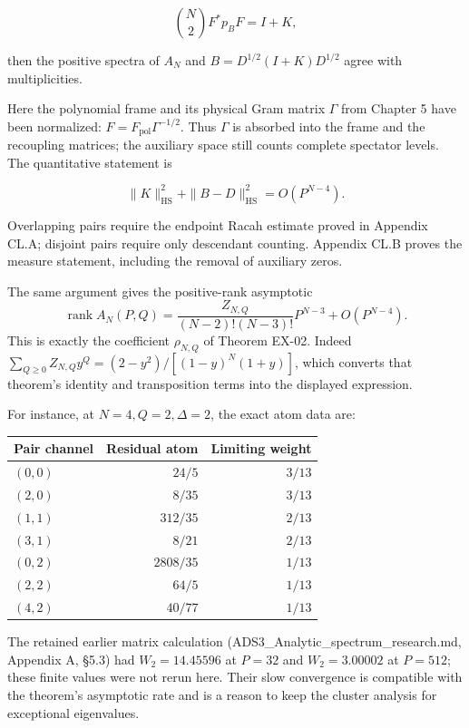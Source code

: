 \[
\binom N2 F^*p_BF=I+K,
\]

then the positive spectra of \(A_N\) and \(B=D^{1/2}(I+K)D^{1/2}\) agree with multiplicities.

Here the polynomial frame and its physical Gram matrix \(\Gamma\) from Chapter 5 have been normalized: \(F=F_{\mathrm{pol}}\Gamma^{-1/2}\). Thus \(\Gamma\) is absorbed into the frame and the recoupling matrices; the auxiliary space still counts complete spectator levels. The quantitative statement is

\[
\|K\|_{\mathrm{HS}}^2+\|B-D\|_{\mathrm{HS}}^2=O(P^{N-4}).
\tag{CL.3}
\]

Overlapping pairs require the endpoint Racah estimate proved in Appendix CL.A; disjoint pairs require only descendant counting. Appendix CL.B proves the measure statement, including the removal of auxiliary zeros.

The same argument gives the positive-rank asymptotic \[
\operatorname{rank}A_N(P,Q)=
\frac{Z_{N,Q}}{(N-2)!(N-3)!}P^{N-3}+O(P^{N-4}).
\] This is exactly the coefficient \(\rho_{N,Q}\) of Theorem EX-02. Indeed \(\sum_{Q\geq0}Z_{N,Q}y^Q=(2-y^2)/[(1-y)^N(1+y)]\), which converts that theorem's identity and transposition terms into the displayed expression.

For instance, at \(N=4,Q=2,\Delta=2\), the exact atom data are:

\begin{longtable}[]{@{}lrr@{}}
\toprule\noalign{}
Pair channel & Residual atom & Limiting weight \\
\midrule\noalign{}
\endhead
\bottomrule\noalign{}
\endlastfoot
\((0,0)\) & \(24/5\) & \(3/13\) \\
\((2,0)\) & \(8/35\) & \(3/13\) \\
\((1,1)\) & \(312/35\) & \(2/13\) \\
\((3,1)\) & \(8/21\) & \(2/13\) \\
\((0,2)\) & \(2808/35\) & \(1/13\) \\
\((2,2)\) & \(64/5\) & \(1/13\) \\
\((4,2)\) & \(40/77\) & \(1/13\) \\
\end{longtable}

The retained earlier matrix calculation (ADS3\_Analytic\_spectrum\_research.md, Appendix A, §5.3) had \(W_2=14.45596\) at \(P=32\) and \(W_2=3.00002\) at \(P=512\); these finite values were not rerun here. Their slow convergence is compatible with the theorem's asymptotic rate and is a reason to keep the cluster analysis for exceptional eigenvalues.

